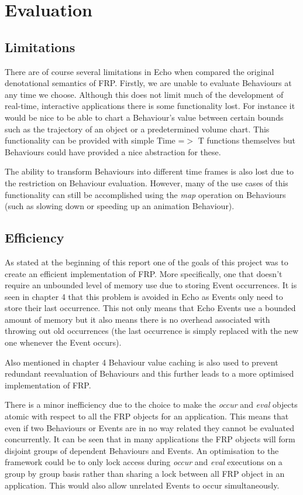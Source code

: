 \chapter{Evaluation}    
  \section{Limitations}
    There are of course several limitations in Echo when compared the original denotational semantics of FRP. Firstly, we are 
    unable to evaluate Behaviours at any time we choose.
    Although this does not limit much of the development of real-time, interactive applications there is some functionality
    lost. For instance it would be nice to be able to chart a Behaviour's value between certain bounds such as
    the trajectory of an object or a predetermined volume chart. This functionality can be provided with simple
    Time =$>$ T functions themselves but Behaviours could have provided a nice abstraction for these.
    
    The ability to transform Behaviours into different time frames is also lost due to the restriction on Behaviour
    evaluation. However, many of the use cases of this functionality can still be accomplished using the
    \emph{map} operation on Behaviours (such as slowing down or speeding up an animation Behaviour).
    
  \section{Efficiency}
    As stated at the beginning of this report one of the goals of this project was to create an efficient implementation
    of FRP. More specifically, one that doesn't require an unbounded level of memory use due to storing Event occurrences.
    It is seen in chapter 4 that this problem is avoided in Echo as Events only need to store their last
    occurrence. This not only means that Echo Events use a bounded amount of memory but it also means there is
    no overhead associated with throwing out old occurrences (the last occurrence is simply replaced with the new 
    one whenever the Event occurs).
    
    Also mentioned in chapter 4 Behaviour value caching is also used to prevent redundant reevaluation of Behaviours
    and this further leads to a more optimised implementation of FRP.
    
    There is a minor inefficiency due to the choice to make the \emph{occur} and \emph{eval} objects atomic
    with respect to all the FRP objects for an application. This means that even if two Behaviours or Events are in no way
    related they cannot be evaluated concurrently. It can be seen that in many applications the FRP objects will
    form disjoint groups of dependent Behaviours and Events. An optimisation to the framework could be to
    only lock access during \emph{occur} and \emph{eval} executions on a group by group basis rather than sharing
    a lock between all FRP object in an application. This would also allow unrelated Events to occur simultaneously.
  
